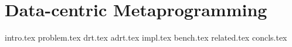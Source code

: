 \chapter{Data-centric Metaprogramming}
\label{chapter:ildl}

{intro.tex}
{problem.tex}
{drt.tex}
{adrt.tex}
{impl.tex}
{bench.tex}
{related.tex}
{concls.tex}
